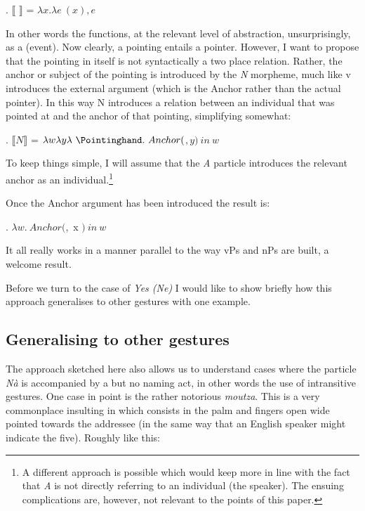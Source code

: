 \documentclass[output=paper]{LSP/langsci}
\begin{document}
\Lsciex.
$\llbracket$ \xspace\Pointinghand $\rrbracket$ = $\lambda x. \lambda e \  $\xspace\Pointinghand$(x), e$

In other words the  functions, at the relevant level of abstraction, unsurprisingly, as a  (event).  Now clearly, a pointing entails a pointer. However, I want to propose that the pointing in itself is not syntactically a two place relation.  Rather, the anchor or subject of the pointing is introduced by the \textit{N} morpheme, much like v introduces the external argument (which is the Anchor rather than the actual pointer).  In this way N introduces a relation between an individual that was pointed at and the anchor of that pointing, simplifying somewhat:

\Lsciex.
$\llbracket N \rrbracket$ = $\lambda w \lambda y \lambda\ \xspace\Pointinghand. \ Anchor($\xspace\Pointinghand$, y)\ in\ w$

To keep things simple, I will assume that the \textit{A} particle introduces the relevant anchor as an individual.\footnote{A different approach is possible which would keep more in line with the fact that \textit{A} is not directly referring to an individual (the speaker).  The ensuing complications are, however, not relevant to the points of this paper.}

Once the Anchor argument has been introduced the result is:

\Lsciex.
$ \lambda w.\  Anchor(${\xspace\Pointinghand},\ x $)\  in \ w$



It all really works in a manner parallel to the way vPs and nPs are built, a welcome result.  

Before we turn to the case of \textit{Yes (Ne)} I would like to show briefly how this approach generalises to other gestures with one example.


\subsection{Generalising to other gestures} \label{sec:moutza}
The approach sketched here also allows us to understand cases where the particle \textit{N\`{a}} is accompanied by a  but no naming act,  in other words the use of intransitive gestures.  One case in point is the rather notorious  \textit{moutza}.  This is a very commonplace insulting  in  which consists in the palm and fingers open wide pointed towards the addressee (in the same way that an English speaker might indicate the  five). Roughly like this:
\end{document}
